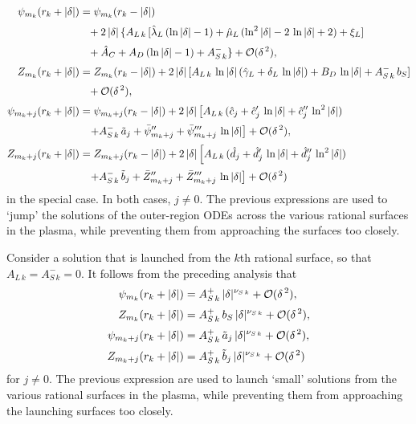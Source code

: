 \documentclass[12pt,prb,aps]{revtex4-1}
\begin{document}
\begin{align}
\psi_{m_k}(r_k+|\delta|) &= \psi_{m_k}(r_k-|\delta|) \nonumber\\[0.5ex]
&\phantom{=}+ 2\,|\delta|\,\{A_{L\,k}\,[\hat{\lambda}_L\,(\ln|\delta|-1)+\hat{\mu}_L\,(\ln^2|\delta|-2\,\ln|\delta|+2)+ \xi_L]\nonumber\\[0.5ex]
&\phantom{=}+ \hat{A}_C
+A_D\,(\ln|\delta|-1) + A_{S\,k}^-\}+ {\cal O}(\delta^{\,2}),\\[0.5ex]
Z_{m_k} (r_k+|\delta|) &=  Z_{m_k}(r_k-|\delta|) + 2\,|\delta|\,[A_{L\,k}\,\ln|\delta| \,(\hat{\gamma}_L+\delta_L\,\ln|\delta|)+ B_D\,\ln|\delta|
+A_{S\,k}^-\,b_{S}]\nonumber\\[0.5ex]&\phantom{=}+ {\cal O}(\delta^{\,2}),\\[0.5ex]
\psi_{m_k+j}(r_k+|\delta|) &= \psi_{m_k+j}(r_k-|\delta|)+2\,|\delta|\left[A_{L\,k}\,(\hat{c}_j+\hat{c}_j'\,\ln|\delta| + \hat{c}_j''\,\ln^2|\delta|) \right.\nonumber\\[0.5ex]
&\phantom{=}
\left.+ A_{S\,k}^-\,\tilde{a}_j + \bar{\psi}_{m_k+j}'' + \bar{\psi}_{m_k+j}'''\,\ln|\delta|\right]+{\cal O}(\delta^{\,2}),\\[0.5ex]
Z_{m_k+j}(r_k+|\delta|) &= Z_{m_k+j}(r_k-|\delta|)
+2\,|\delta|\left[A_{L\,k}\,(\hat{d}_j+\hat{d}_j'\,\ln|\delta| + \hat{d}_j''\,\ln^2|\delta|) \right.\nonumber\\[0.5ex]
&\phantom{=}
\left.+ A_{S\,k}^-\,\tilde{b}_j + \bar{Z}_{m_k+j}'' + \bar{Z}_{m_k+j}'''\,\ln|\delta|\right]+{\cal O}(\delta^{\,2})
\label{c2}
\end{align}
in the special case. In both cases, $j\neq 0$. The previous expressions are used to `jump' the solutions of the outer-region ODEs across
the various rational surfaces in the plasma, while preventing them from approaching the surfaces too closely.

Consider a solution that is launched from the $k$th rational surface, so that $A_{L\,k} = A_{S\,k}^-=0$. It follows from the preceding analysis that
\begin{align}\label{l1}
\psi_{m_k}(r_k+|\delta|) &= A_{S\,k}^+\,|\delta|^{\nu_{S\,k}}+ {\cal O}(\delta^{\,2}),\\[0.5ex]
Z_{m_k}(r_k+|\delta|) &= A_{S\,k}^+\,b_S\,|\delta|^{\nu_{S\,k}}+ {\cal O}(\delta^{\,2}),\\[0.5ex]
\psi_{m_k+j}(r_k+|\delta|)& = A_{S\,k}^+\,\tilde{a}_j\,|\delta|^{\nu_{S\,k}}+ {\cal O}(\delta^{\,2}),\\[0.5ex]
Z_{m_k+j}(r_k+|\delta|) &= A_{S\,k}^+\,\tilde{b}_j\,|\delta|^{\nu_{S\,k}}+ {\cal O}(\delta^{\,2})\label{l2}
\end{align}
for $j\neq 0$. The previous expression are used to launch `small' solutions from the various rational surfaces in the plasma, while preventing them from approaching the launching surfaces  too closely.
\end{document}
